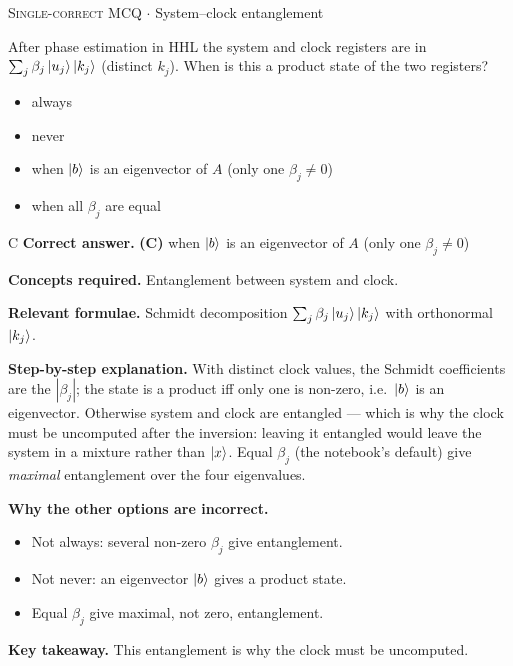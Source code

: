 \documentclass[11pt,a4paper]{article}
\newcommand{\optlabel}[1]{\textbf{(#1)}}
\newcommand{\correctlabel}[1]{\textcolor{okgreen}{\textbf{(#1)}\,\ding{51}}}
\newenvironment{qitem}[1]{\begin{list}{}{\setlength{\leftmargin}{3.3em}\setlength{\labelwidth}{3.1em}%
  \setlength{\labelsep}{0.2em}\setlength{\topsep}{3pt}\setlength{\parsep}{3pt}}\item[\textbf{Q.#1}\hfill]}{\end{list}}
\newcommand{\qsep}{\par\vspace{2pt}{\color{black!15}\hrule}\vspace{4pt}}
\newcommand{\qmeta}[2]{{\footnotesize\color{black!60}\textsc{#1} \;$\cdot$\; #2}\par}
\begin{document}
\begin{qitem}{32}
\qmeta{Single-correct MCQ}{System--clock entanglement}
After phase estimation in HHL the system and clock registers are in $\sum_j\beta_j\ket{u_j}\ket{k_j}$ (distinct $k_j$). When is this a product state of the two registers?
\begin{itemize}[leftmargin=2.6em, labelsep=0.4em, itemsep=2pt, topsep=3pt]
\item[\optlabel{A}] always
\item[\optlabel{B}] never
\item[\correctlabel{C}] when $\ket b$ is an eigenvector of $A$ (only one $\beta_j \ne 0$)
\item[\optlabel{D}] when all $\beta_j$ are equal
\end{itemize}
\end{qitem}
\begin{solbox}{C}
\textbf{\color{brand}Correct answer.} \textcolor{okgreen}{\textbf{(C)}} when $\ket b$ is an eigenvector of $A$ (only one $\beta_j \ne 0$)

\textbf{\color{brand}Concepts required.} Entanglement between system and clock.

\textbf{\color{brand}Relevant formulae.} Schmidt decomposition $\sum_j\beta_j\ket{u_j}\ket{k_j}$ with orthonormal $\ket{k_j}$.

\textbf{\color{brand}Step-by-step explanation.} With distinct clock values, the Schmidt coefficients are the $|\beta_j|$; the state is a product iff only one is non-zero, i.e.\ $\ket b$ is an eigenvector. Otherwise system and clock are entangled
--- which is why the clock must be uncomputed after the inversion: leaving it entangled would leave the system in a mixture rather than $\ket x$.
Equal $\beta_j$ (the notebook's default) give \emph{maximal} entanglement over the four eigenvalues.

\textbf{\color{brand}Why the other options are incorrect.}
\begin{itemize}[leftmargin=2.4em, itemsep=1pt, topsep=2pt]
\item[\textbf{(A)}] Not always: several non-zero $\beta_j$ give entanglement.
\item[\textbf{(B)}] Not never: an eigenvector $\ket b$ gives a product state.
\item[\textbf{(D)}] Equal $\beta_j$ give maximal, not zero, entanglement.
\end{itemize}
\textbf{\color{brand}Key takeaway.} This entanglement is why the clock must be uncomputed.
\end{solbox}
\qsep
\end{document}

